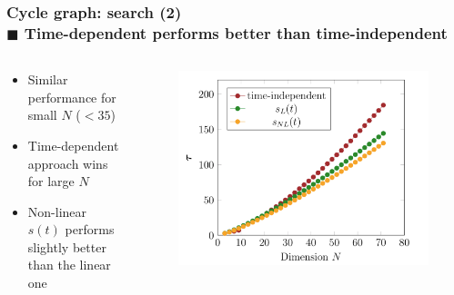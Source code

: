 \documentclass{beamer}
\begin{document}
\begin{frame}
\frametitle{Cycle graph: search (2) \\ \normalsize $\blacksquare$ Time-dependent performs better than time-independent}

\begin{columns}
	\begin{column}[T]{0.5\textwidth}
		\begin{itemize}
			\item Similar performance for small $N$ ($<35$)
			\item Time-dependent approach wins for large $N$
			\item Non-linear $s(t)$ performs slightly better than the linear one
		\end{itemize}
		\vspace{-0.3cm}
		
	\end{column}

	\begin{column}[T]{0.5\textwidth}
		\vspace{-0.5cm}
		\begin{figure}
			\includegraphics[width=\textwidth]{tau.png}
		\end{figure}
	\end{column}

\end{columns}
\end{frame}

\end{document}
